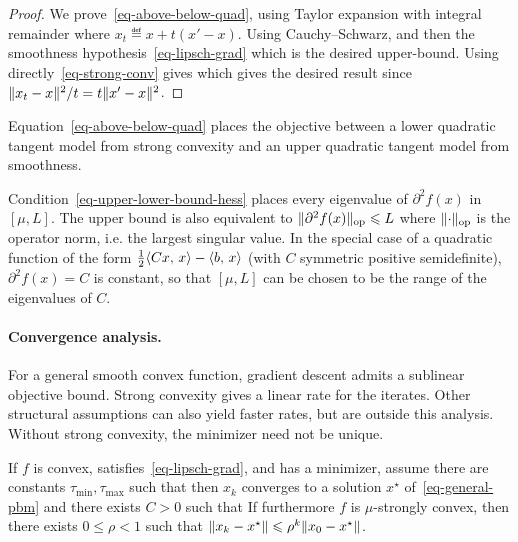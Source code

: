 \begin{proof}
	We prove~\eqref{eq-above-below-quad}, using Taylor expansion with integral remainder
	where $x_t \eqdef x+t(x'-x)$.
	Using Cauchy--Schwarz, and then the smoothness hypothesis~\eqref{eq-lipsch-grad}
	which is the desired upper-bound. Using directly~\eqref{eq-strong-conv} gives 
	which gives the desired result since $\lVert x_t-x\rVert^2 / t = t \lVert x'-x\rVert^2$.
\end{proof}

Equation~\eqref{eq-above-below-quad} places the objective between a lower quadratic tangent model from strong convexity and an upper quadratic tangent model from smoothness.

Condition~\eqref{eq-upper-lower-bound-hess} places every eigenvalue of $\partial^2 f(x)$ in $[\mu,L]$. The upper bound is also equivalent to $\lVert\partial^2 f(x)\rVert_{\text{op}} \leqslant L$ where $\lVert\cdot\rVert_{\text{op}}$ is the operator norm, i.e. the largest singular value.
%
In the special case of a quadratic function of the form $\frac12\langle Cx,\,x\rangle-\langle b,\,x\rangle$ (with $C$ symmetric positive semidefinite), $\partial^2 f(x)=C$ is constant, so that $[\mu,L]$ can be chosen to be the range of the eigenvalues of $C$.

\paragraph{Convergence analysis.}

For a general smooth convex function, gradient descent admits a sublinear objective bound. Strong convexity gives a linear rate for the iterates. Other structural assumptions can also yield faster rates, but are outside this analysis.
%
Without strong convexity, the minimizer need not be unique.

\begin{thm}\label{thm-gradsec-non-strong-conv}\label{thm-gradsec-strong-conv}
	If $f$ is convex, satisfies~\eqref{eq-lipsch-grad}, and has a minimizer, assume there are constants $\tau_{\min},\tau_{\max}$ such that
	then $x_k$ converges to a solution $x^\star$ of~\eqref{eq-general-pbm} and
	there exists $C>0$ such that 
	If furthermore $f$ is $\mu$-strongly convex, then there exists $0 \leq \rho < 1$ such that $\lVert x_k-x^\star\rVert \leqslant \rho^k \lVert x_0-x^\star\rVert$.
\end{thm}

